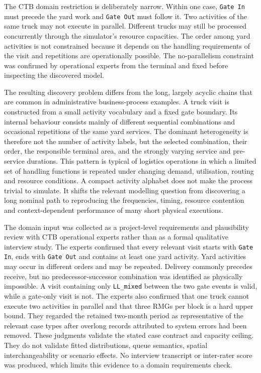 The CTB domain restriction is deliberately narrow. Within one case,
\texttt{Gate In} must precede the yard work and \texttt{Gate Out} must follow
it. Two activities of the same truck may not execute in parallel. Different
trucks may still be processed concurrently through the simulator's resource
capacities. The order among yard activities is not constrained because it
depends on the handling requirements of the visit and repetitions are
operationally possible. The no-parallelism constraint was confirmed by
operational experts from the terminal and fixed before inspecting the
discovered model.

The resulting discovery problem differs from the long, largely acyclic chains
that are common in administrative business-process examples. A truck visit is
constructed from a small activity vocabulary and a fixed gate boundary. Its
internal behaviour consists mainly of different sequential combinations and
occasional repetitions of the same yard services. The dominant heterogeneity
is therefore not the number of activity labels, but the selected combination,
their order, the responsible terminal area, and the strongly varying service
and pre-service durations. This pattern is typical of logistics operations in
which a limited set of handling functions is repeated under changing demand,
utilisation, routing and resource conditions. A compact activity alphabet does
not make the process trivial to simulate. It shifts the relevant modelling
question from discovering a long nominal path to reproducing the frequencies,
timing, resource contention and context-dependent performance of many short
physical executions.

The domain input was collected as a project-level requirements and
plausibility review with CTB operational experts rather than as a formal
qualitative interview study. The experts confirmed that every relevant visit
starts with \texttt{Gate In}, ends with \texttt{Gate Out} and contains at least
one yard activity. Yard activities may occur in different orders and may be
repeated. Delivery commonly precedes receive, but no predecessor-successor
combination was identified as physically impossible. A visit containing only
\texttt{LL\_mixed} between the two gate events is valid, while a gate-only
visit is not. The experts also confirmed that one truck cannot execute two
activities in parallel and that three RMGs per block is a hard upper bound.
They regarded the retained two-month period as representative of the relevant
case types after overlong records attributed to system errors had been removed.
These judgments validate the stated case contract and capacity ceiling. They
do not validate fitted distributions, queue semantics, spatial
interchangeability or scenario effects. No interview transcript or inter-rater
score was produced, which limits this evidence to a domain requirements check.

